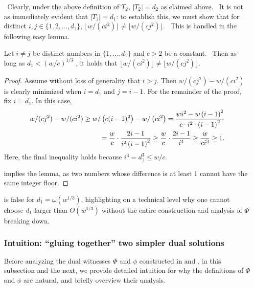  \ Clearly,
under the above definition of $T_{2}$, $|T_{2}|=d_{2}$ as claimed above. \
It is not as immediately evident that $|T_{1}|=d_{1}$: to establish this, we
must show that for distinct $i,j\in \{1,2,\dots ,d_{1}\}$, $\lfloor
w/(ci^{2})\rfloor \neq \lfloor w/(cj^{2})\rfloor $. \ This is handled in the
following easy lemma.

\begin{lemma}
\label{lem:distinct} Let $i\neq j$ be distinct numbers in $\{1,\dots ,d_{1}\}
$ and $c>2$ be a constant. \ Then as long as $d_{1}<\left( w/c\right) ^{1/3}$
, it holds that $\lfloor w/(ci^{2})\rfloor \neq \lfloor w/(cj^{2})\rfloor $.
\end{lemma}

\begin{proof}
Assume without loss of generality that  $i> j$. Then $w/(c j^2)- w/(c i^2)$ is clearly minimized when $i=d_1$ and $j=i-1$.
For the remainder of the proof, fix $i=d_1$.
In this case,
\begin{align}
w/(c j^2) - w/(c i^2) \geq
w/\left(c (i-1)^2\right) - w/\left(c i^2\right)
= \frac{w i^2 - w \left(i-1\right)^2}{c \cdot i^2 \cdot \left(i-1\right)^2} \notag \\
= \frac{w}{c} \cdot \frac{2i-1}{i^2\left(i-1\right)^2 }
\geq \frac{w}{c} \cdot \frac{2i-1}{i^4}
\geq \frac{w}{c i^3} \geq 1. \label{eq28}
\end{align}
Here, the final inequality holds because $i^3 = d_1^3 \leq w/c$.

 implies the lemma, as two numbers whose difference is at least 1 cannot have
the same integer floor.
\end{proof}

 is false for $d_1 = \omega(w^{1/3})$, highlighting on a
technical level why one cannot choose $d_1$ larger than $\Theta(w^{1/3})$
without the entire construction and analysis of $\Phi$ breaking down.

\subsubsection{Intuition: ``gluing together'' two simpler dual solutions}

Before analyzing the dual witnesses
$\Phi$ and $\phi$ constructed in  and ,
in this subsection and the next, we provide detailed intuition
for why the definitions of $\Phi$ and $\phi$ are natural,
and briefly overview their analysis. 

